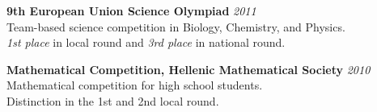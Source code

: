 \documentclass[margin]{res}
\begin{document}
\begin{resume}
\textbf{9th European Union Science Olympiad} \hfill {\em 2011} \\ 
Team-based science competition in Biology, Chemistry, and Physics.\\
\textit{1st place} in local round and \textit{3rd place} in  national round. 

\textbf{Mathematical Competition, Hellenic Mathematical Society} \hfill {\em 2010} \\ 
Mathematical competition for high school students. \\
Distinction in the 1st and 2nd local round. 








\end{resume}
\end{document}
